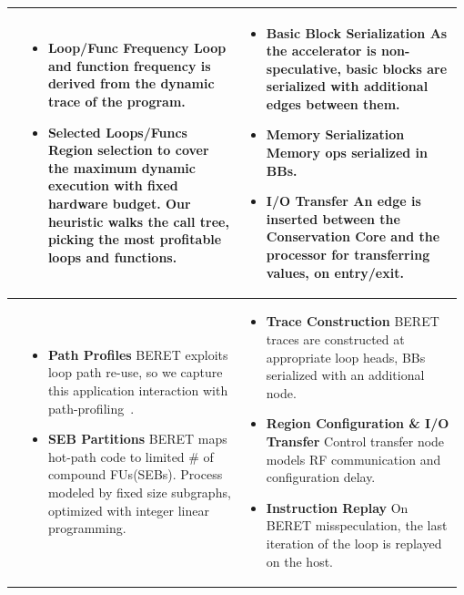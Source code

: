 \begin{table}[h]
\begin{adjustwidth}{-0.6in}{-0.6in}
\begin{center}
\begin{tabular}{m{0.02\linewidth}m{0.48\linewidth}m{0.48\linewidth}}
\parbox[t]{1mm}{} 
& 
\begin{itemize}
  \item \textbf{Loop/Func Frequency} Loop and function frequency is 
  derived from the dynamic trace of the program.
  \item \textbf{Selected Loops/Funcs} Region selection to cover
the maximum dynamic execution with fixed hardware budget.
Our heuristic walks the call tree, picking the most profitable loops and functions.
\end{itemize}
&
\begin{itemize}
\item \textbf{Basic Block Serialization}  As the accelerator is non-speculative,
basic blocks are serialized with additional edges between them. 
\item \textbf{Memory Serialization} Memory ops serialized in BBs.
\item \textbf{I/O Transfer} An edge is inserted between the Conservation
Core and the processor for transferring values, on entry/exit.
\end{itemize}

\\ [-0.6\normalbaselineskip]  \midrule

 
\parbox[t]{1mm}{} 
& 
\begin{itemize}
  \item \textbf{Path Profiles}
  BERET exploits loop path re-use, so we capture this application interaction with path-profiling~\cite{path-profiling}.  
  \item \textbf{SEB Partitions}
BERET maps hot-path code to limited \# of compound FUs(SEBs). 
Process modeled by fixed size subgraphs, optimized with integer linear programming.
\end{itemize}

&
\begin{itemize}
\item \textbf{Trace Construction}
BERET traces are constructed at appropriate loop heads, BBs serialized with
an additional node.
  \item \textbf{Region Configuration \& I/O Transfer}
Control transfer node models RF communication and configuration delay. 
\item \textbf{Instruction Replay}
On BERET misspeculation, the last iteration of the loop is replayed on the host.
\end{itemize}
\\  [-0.6\normalbaselineskip] \midrule



\end{tabular}
\end{center}
\end{adjustwidth}
\end{table}
